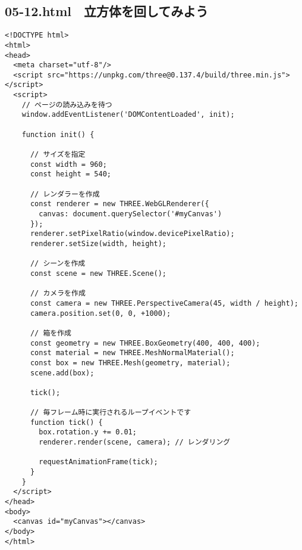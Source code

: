 \documentclass[mingoth,11pt,a4j,uplatex]{jsarticle}
\begin{document}
\subsection{05-12.html　立方体を回してみよう}
\begin{lstlisting}[caption=05-12.html]
<!DOCTYPE html>
<html>
<head>
  <meta charset="utf-8"/>
  <script src="https://unpkg.com/three@0.137.4/build/three.min.js"></script>
  <script>
    // ページの読み込みを待つ
    window.addEventListener('DOMContentLoaded', init);

    function init() {

      // サイズを指定
      const width = 960;
      const height = 540;

      // レンダラーを作成
      const renderer = new THREE.WebGLRenderer({
        canvas: document.querySelector('#myCanvas')
      });
      renderer.setPixelRatio(window.devicePixelRatio);
      renderer.setSize(width, height);

      // シーンを作成
      const scene = new THREE.Scene();

      // カメラを作成
      const camera = new THREE.PerspectiveCamera(45, width / height);
      camera.position.set(0, 0, +1000);

      // 箱を作成
      const geometry = new THREE.BoxGeometry(400, 400, 400);
      const material = new THREE.MeshNormalMaterial();
      const box = new THREE.Mesh(geometry, material);
      scene.add(box);

      tick();

      // 毎フレーム時に実行されるループイベントです
      function tick() {
        box.rotation.y += 0.01;
        renderer.render(scene, camera); // レンダリング

        requestAnimationFrame(tick);
      }
    }
  </script>
</head>
<body>
  <canvas id="myCanvas"></canvas>
</body>
</html>
\end{lstlisting}
\end{document}
